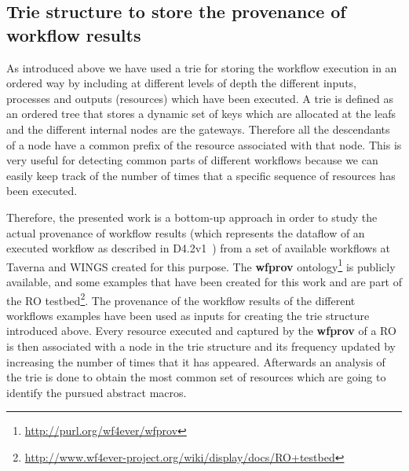 \subsection{Trie structure to store the provenance of workflow results}
As introduced above we have used a trie for storing the workflow execution in an ordered way by including at different levels of depth the different inputs, processes and outputs (resources) which have been executed. A trie is defined as an ordered tree that stores a dynamic set of keys which are allocated at the leafs and the different internal nodes are the gateways. Therefore all the descendants of a node have a common prefix of the resource associated with that node. This is very useful for detecting common parts of different workflows because we can easily keep track of the number of times that a specific sequence of resources has been executed.

Therefore, the presented work is a bottom-up approach in order to study the actual provenance of workflow results (which represents the dataflow of an executed workflow as described in D4.2v1~\cite{D4.2v1}) from a set of available workflows at Taverna and WINGS created for this purpose. The \textbf{wfprov} ontology\footnote{\url{http://purl.org/wf4ever/wfprov}} is publicly available, and some examples that have been created for this work and are part of the RO testbed\footnote{\url{http://www.wf4ever-project.org/wiki/display/docs/RO+testbed}}. The provenance of the workflow results of the different workflows examples have been used as inputs for creating the trie structure introduced above. Every resource executed and captured by the \textbf{wfprov} of a RO is then associated with a node in the trie structure and its frequency updated by increasing the number of times that it has appeared. Afterwards an analysis of the trie is done to obtain the most common set of resources which are going to identify the pursued abstract macros. \\


 
